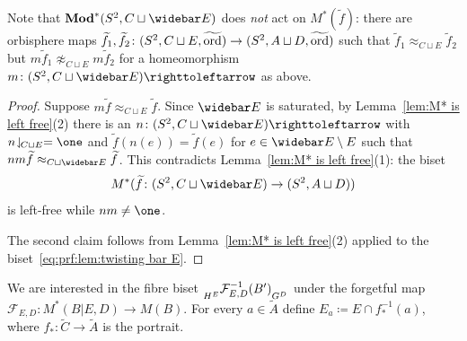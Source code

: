 \documentclass{amsart}
\newcommand\Forget{{\mathcal F}}
\newcommand\wtf{{\widetilde f}}
\newcommand\wtA{{\widetilde A}}
\newcommand\wtC{{\widetilde C}}
\newcommand\wtord{{\widetilde\ord}}
\begin{document}
Note that $\Mod^*(S^2,C\sqcup \widebar E)$ does \emph{not} act on
$M^*(\wtf)$: there are orbisphere maps
$\wtf_1,\wtf_2\colon (S^2, C\sqcup E,\wtord)\to (S^2, A\sqcup
D,\wtord)$ such that $\wtf_1\approx_{C\sqcup E} \wtf_2$ but
$m \wtf_1\not\approx_{C\sqcup E} m \wtf_2$ for a homeomorphism
$m\colon (S^2,C\sqcup \widebar E)\selfmap$ as above.

\begin{proof}
  Suppose $m \wtf\approx_{C\sqcup E} \wtf$. Since $\widebar E$ is
  saturated, by Lemma~\ref{lem:M* is left free}(2) there is an
  $n\colon (S^2,C\sqcup \widebar E)\selfmap$ with
  $n\restrict {C\sqcup E}=\one$ and $\wtf(n(e))=\wtf(e)$ for
  $e\in \widebar E\setminus E$ such that
  $n m \wtf\approx_{C\sqcup \widebar E} \wtf$. This contradicts
  Lemma~\ref{lem:M* is left free}(1): the biset
  \begin{equation}\label{eq:prf:lem:twisting bar E}
    M^*(\wtf \colon (S^2, C\sqcup \widebar E)\to (S^2, A\sqcup D))
  \end{equation}
  is left-free while $n m\neq\one$.

  The second claim follows from Lemma~\ref{lem:M* is left free}(2)
  applied to the biset~\eqref{eq:prf:lem:twisting bar E}.
\end{proof}

We are interested in the fibre biset
$\subscript{H^E}{ \Forget_{E,D}^{-1}(B')}_{G^D}$ under the forgetful
map $\Forget_{E,D}\colon M^*(B|E,D)\to M(B)$. For every
$a\in \wtA$ define $E_a\coloneqq E\cap f_*^{-1}(a)$, where
$f_*\colon \wtC\to\wtA$ is the portrait.
\end{document}
